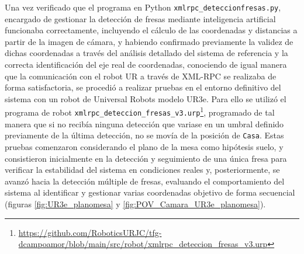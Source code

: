 Una vez verificado que el programa en Python \verb|xmlrpc_deteccionfresas.py|, encargado de gestionar la detección de fresas mediante inteligencia artificial funcionaba correctamente, incluyendo el cálculo de las coordenadas y distancias a partir de la imagen de cámara, y habiendo confirmado previamente la validez de dichas coordenadas a través del análisis detallado del sistema de referencia y la correcta identificación del eje real de coordenadas, conociendo de igual manera que la comunicación con el robot UR a través de XML-RPC se realizaba de forma satisfactoria, se procedió a realizar pruebas en el entorno definitivo del sistema con un robot de Universal Robots modelo UR3e. Para ello se utilizó el programa de robot \verb|xmlrpc_deteccion_fresas_v3.urp|\footnote{\url{https://github.com/RoboticsURJC/tfg-dcampoamor/blob/main/src/robot/xmlrpc_deteccion_fresas_v3.urp}}, programado de tal manera que si no recibía ninguna detección que variase en un umbral definido previamente de la última detección, no se movía de la posición de \texttt{Casa}. Estas pruebas comenzaron considerando el plano de la mesa como hipótesis suelo, y consistieron inicialmente en la detección y seguimiento de una única fresa para verificar la estabilidad del sistema en condiciones reales y, posteriormente, se avanzó hacia la detección múltiple de fresas, evaluando el comportamiento del sistema al identificar y gestionar varias coordenadas objetivo de forma secuencial (figuras \ref{fig:UR3e_planomesa} y \ref{fig:POV_Camara_UR3e_planomesa}).

